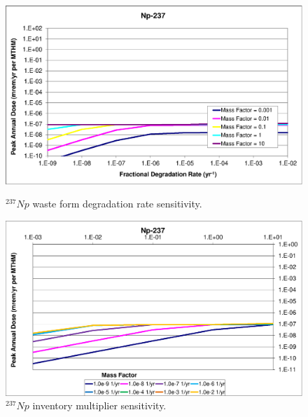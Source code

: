 \begin{figure}[ht]
\begin{minipage}[b]{0.45\linewidth}

\includegraphics[width=\linewidth]{./chapters/nuclide_sensitivity/clay/WFDegAndInv/Np-237.eps}
\caption{$^{237}Np$ waste form degradation rate sensitivity.}
\label{fig:WFDegNp237}

\end{minipage}
\hspace{0.05\linewidth}
\begin{minipage}[b]{0.45\linewidth}

\includegraphics[width=\linewidth]{./chapters/nuclide_sensitivity/clay/WFDegAndInv/Np-237-MF.eps}
\caption{$^{237}Np$ inventory multiplier sensitivity.}
\label{fig:WFDegNp237MF}

\end{minipage}
\end{figure}
\clearpage 
